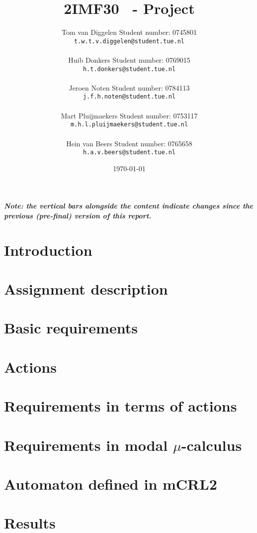 \documentclass[a4paper,twoside,11pt]{article}
\title{\sffamily\bfseries 2IMF30 \scg\ - Project}
\author{Tom van Diggelen \qquad Student number: 0745801 \\{\tt t.w.t.v.diggelen@student.tue.nl}\\ \\ Huib Donkers \qquad Student number: 0769015 \\{\tt h.t.donkers@student.tue.nl} \\ \\ Jeroen Noten \qquad Student number: 0784113 \\{\tt j.f.h.noten@student.tue.nl}\\ \\ Mart Pluijmaekers \qquad Student number: 0753117 \\{\tt m.h.l.pluijmaekers@student.tue.nl} \\ \\ Hein van Beers \qquad Student number: 0765658 \\{\tt h.a.v.beers@student.tue.nl}}
\date{\today}
\begin{document}
\maketitle

\cbstart
\textbf{\emph{Note: the vertical bars alongside the content indicate changes since the previous (pre-final) version of this report.}}
\cbend

\newpage
\tableofcontents

\newpage
\section{Introduction}


\newpage
\section{Assignment description}


\section{Basic requirements}



\section{Actions}


\section{Requirements in terms of actions}


\section{Requirements in modal $\mu$-calculus}


\newpage
\section{Automaton defined in mCRL2}


\section{Results}

\end{document}
